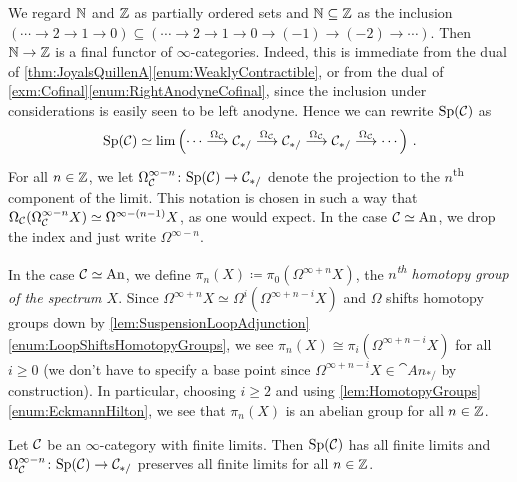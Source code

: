 \begin{con}\label{con:HomotopyGroupsOfSpectra}
	We regard $\mathbb{N}$ and $\mathbb{Z}$ as partially ordered sets and $\mathbb{N}\subseteq \mathbb{Z}$ as the inclusion $(\dotsb\rightarrow 2\rightarrow 1\rightarrow0)\subseteq (\dotsb\rightarrow 2\rightarrow 1 \rightarrow 0\rightarrow (-1)\rightarrow (-2)\rightarrow\dotsb)$. Then $\mathbb{N}\rightarrow \mathbb{Z}$ is a final functor of $\infty$-categories. Indeed, this is immediate from the dual of \cref{thm:JoyalsQuillenA}\cref{enum:WeaklyContractible}, or from the dual of \cref{exm:Cofinal}\cref{enum:RightAnodyneCofinal}, since the inclusion under considerations is easily seen to be left anodyne. Hence we can rewrite $\mathrm{Sp}(\mathcal{C})$ as
	\begin{equation*}
		\mathrm{Sp}(\mathcal{C})\simeq \operatorname*{lim}\left(\dotsb\overset{\Omega_{\mathcal{C}}}{\longrightarrow} \mathcal{C}_{*/}\overset{\Omega_{\mathcal{C}}}{\longrightarrow} \mathcal{C}_{*/}\overset{\Omega_{\mathcal{C}}}{\longrightarrow} \mathcal{C}_{*/}\overset{\Omega_{\mathcal{C}}}{\longrightarrow}\dotsb\right)\,.
	\end{equation*}
	For all $n\in\mathbb{Z}$, we let $\Omega_{\mathcal{C}}^{\infty-n}\colon \mathrm{Sp}(\mathcal{C})\rightarrow \mathcal{C}_{*/}$ denote the projection to the $n$\textsuperscript{th} component of the limit. This notation is chosen in such a way that $\Omega_{\mathcal{C}}(\Omega_{\mathcal{C}}^{\infty-n}X)\simeq \Omega^{\infty-(n-1)}X$, as one would expect. In the case $\mathcal{C}\simeq \mathrm{An}$, we drop the index and just write $\Omega^{\infty-n}$.
	
	In the case $\mathcal{C}\simeq \mathrm{An}$, we define $\pi_n(X)\coloneqq \pi_0(\Omega^{\infty+n}X)$, the \emph{$n$\textsuperscript{th} homotopy group of the spectrum $X$}. Since $\Omega^{\infty+n}X\simeq \Omega^i(\Omega^{\infty+n-i}X)$ and $\Omega$ shifts homotopy groups down by \cref{lem:SuspensionLoopAdjunction}\cref{enum:LoopShiftsHomotopyGroups}, we see $\pi_n(X)\cong \pi_i(\Omega^{\infty+n-i}X)$ for all $i\geqslant 0$ (we don't have to specify a base point since $\Omega^{\infty+n-i}X\in\cat{An}_{*/}$ by construction). In particular, choosing $i\geqslant 2$ and using \cref{lem:HomotopyGroups}\cref{enum:EckmannHilton}, we see that $\pi_n(X)$ is an abelian group for all $n\in\mathbb{Z}$.
\end{con}
\begin{lem}\label{lem:SpCHasLimits}
	Let $\mathcal{C}$ be an $\infty$-category with finite limits. Then $\mathrm{Sp}(\mathcal{C})$ has all finite limits and $\Omega_{\mathcal{C}}^{\infty-n}\colon \mathrm{Sp}(\mathcal{C})\rightarrow \mathcal{C}_{*/}$ preserves all finite limits for all $n\in\mathbb{Z}$.
\end{lem}
